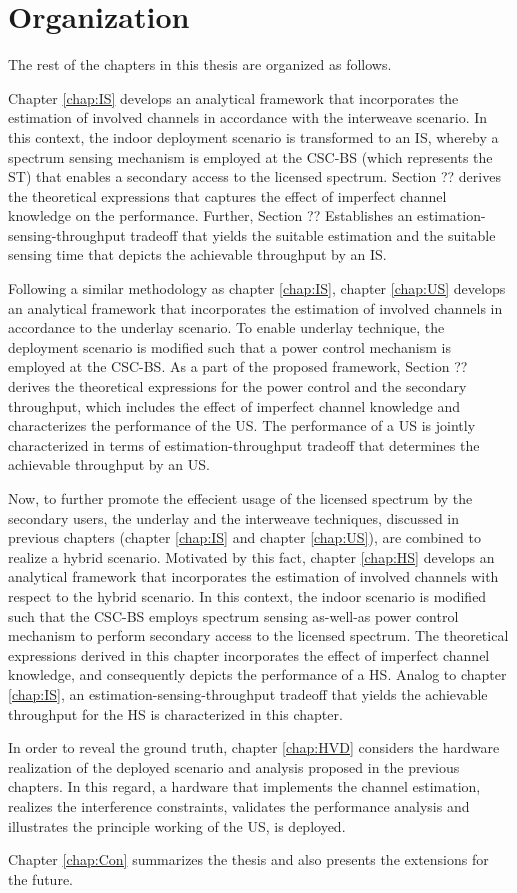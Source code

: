 \section{Organization} 

The rest of the chapters in this thesis are organized as follows.

Chapter \ref{chap:IS} develops an analytical framework that incorporates the estimation of involved channels in accordance with the interweave scenario. In this context, the indoor deployment scenario is transformed to an IS, whereby a spectrum sensing mechanism is employed at the CSC-BS (which represents the ST) that enables a secondary access to the licensed spectrum. Section ?? derives the theoretical expressions that captures the effect of imperfect channel knowledge on the performance. Further, Section ?? Establishes an estimation-sensing-throughput tradeoff that yields the suitable estimation and the suitable sensing time that depicts the achievable throughput by an IS. 


Following a similar methodology as chapter \ref{chap:IS}, chapter \ref{chap:US} develops an analytical framework that incorporates the estimation of involved channels in accordance to the underlay scenario. To enable underlay technique, the deployment scenario is modified such that a power control mechanism is employed at the CSC-BS. As a part of the proposed framework, Section ?? derives the theoretical expressions for the power control and the secondary throughput, which includes the effect of imperfect channel knowledge and characterizes the performance of the US. The performance of a US is jointly characterized in terms of estimation-throughput tradeoff that determines the achievable throughput by an US. 


Now, to further promote the effecient usage of the licensed spectrum by the secondary users, the underlay and the interweave techniques, discussed in previous chapters (chapter \ref{chap:IS} and chapter \ref{chap:US}), are combined to realize a hybrid scenario. Motivated by this fact, chapter \ref{chap:HS} develops an analytical framework that incorporates the estimation of involved channels with respect to the hybrid scenario. In this context, the indoor scenario is modified such that the CSC-BS employs spectrum sensing as-well-as power control mechanism to perform secondary access to the licensed spectrum. The theoretical expressions derived in this chapter incorporates the effect of imperfect channel knowledge, and consequently depicts the performance of a HS. Analog to chapter \ref{chap:IS}, an estimation-sensing-throughput tradeoff that yields the achievable throughput for the HS is characterized in this chapter. 

 
In order to reveal the ground truth, chapter \ref{chap:HVD} considers the hardware realization of the deployed scenario and analysis proposed in the previous chapters. In this regard, a hardware that implements the channel estimation, realizes the interference constraints, validates the performance analysis and illustrates the principle working of the US, is deployed.   

Chapter \ref{chap:Con} summarizes the thesis and also presents the extensions for the future. 
